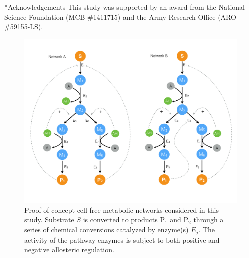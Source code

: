 \documentclass[12pt]{article}
\makeatletter
\renewcommand\section{\@startsection
	{subsection}{2}{0mm}
	{-0.2in}
	{0.05\baselineskip}
	{\normalfont\large\bfseries}}
\makeatother
\begin{document}
\section*{Acknowledgements}
This study was supported by an award from the National Science Foundation (MCB \#1411715) 
and the Army Research Office (ARO \#59155-LS).

\clearpage
%
%




\clearpage

\begin{figure}
\centering
\includegraphics[width=1.0\textwidth]{./figs/Figure-1-Networks.pdf}
\caption{Proof of concept cell-free metabolic networks considered in this study. Substrate $S$ is converted to products P$_{1}$ and P$_{2}$ through a series of chemical conversions
catalyzed by enzyme(s) $E_{j}$. The activity of the pathway enzymes is subject to both positive and negative allosteric regulation. }\label{fig-networks}
\end{figure}

\clearpage
\end{document}
